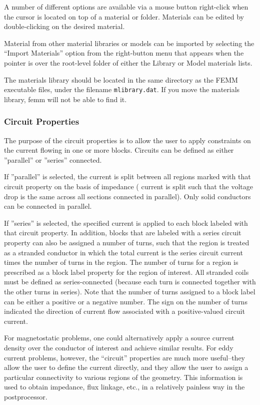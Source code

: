 \documentclass[12pt]{report}
\begin{document}
A number of different options are available via a mouse button right-click
when the cursor is located on top of a material or folder. Materials can be edited
by double-clicking on the desired material.

Material from other material libraries or models can be imported by selecting the
``Import Materials'' option from the right-button menu that appears when the pointer
is over the root-level folder of either the Library or Model materials lists.

The materials library should be located in the same directory as
the FEMM executable files, under the filename \verb+mlibrary.dat+.
If you move the materials library, femm will not be able to find
it.

\subsubsection{Circuit Properties}

The purpose of the circuit properties is to allow the user
to apply constraints on the current flowing in one
or more blocks. Circuits can be defined as either ''parallel'' or
''series'' connected.

If ''parallel'' is selected, the current is
split between all regions marked with that circuit property on the
basis of impedance ({\em} current is split such that the voltage drop
is the same across all sections connected in parallel).  Only solid
conductors can be connected in parallel.

If ''series'' is selected, the specified current is applied to each block
labeled with that circuit property.  In addition, blocks that are
labeled with a series circuit property can also be assigned a number of
turns, such that the region is treated as a stranded conductor in which
the total current is the series circuit current times the number of turns
in the region.  The number of turns for a region is prescribed as a block
label property for the region of interest.  All stranded coils must be
defined as series-connected (because each turn is connected together with
the other turns in series).  Note that the number of turns assigned to
a block label can be either a positive or a negative number.  The sign
on the number of turns indicated the direction of current flow associated
with a positive-valued circuit current.

For magnetostatic problems, one could alternatively apply a source
current density over the conductor of interest and achieve similar
results. For eddy current problems, however, the ``circuit''
properties are much more useful--they allow the user to define the
current directly, and they allow the user to assign a particular connectivity
to various regions of the geometry.  This information is used to
obtain impedance, flux linkage, etc., in a relatively painless way
in the postprocessor.
\end{document}
